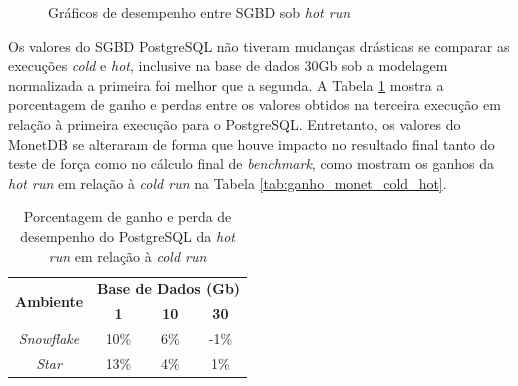 \begin{figure}[htpb]
        \centering
        \caption{Gráficos de desempenho entre SGBD sob \textit{hot run}}
        \label{fig:qph_sgbd_hot}
\end{figure}

Os valores do SGBD PostgreSQL não tiveram mudanças drásticas se comparar as execuções \textit{cold} e \textit{hot}, inclusive na base de dados 30Gb sob a modelagem normalizada a primeira foi melhor que a segunda. A Tabela \ref{tab:ganho_postgresql_cold_hot} mostra a porcentagem de ganho e perdas entre os valores obtidos na terceira execução em relação à primeira execução para o PostgreSQL. Entretanto, os valores do MonetDB se alteraram de forma que houve impacto no resultado final tanto do teste de força como no cálculo final de \textit{benchmark}, como mostram os ganhos da \textit{hot run} em relação à \textit{cold run} na Tabela \ref{tab:ganho_monet_cold_hot}.

\begin{table}[htpb]
        \centering
        \caption{Porcentagem de ganho e perda de desempenho do PostgreSQL da \textit{hot run} em relação à \textit{cold run}}
        \label{tab:ganho_postgresql_cold_hot}
        \begin{tabular}{|c|c|c|c|}
        \hline
        \multirow{2}{*}{\textbf{Ambiente}} & \multicolumn{3}{c|}{\textbf{Base de Dados (Gb)}} \\ \cline{2-4} 
        & \textbf{1}     & \textbf{10}    & \textbf{30}    \\ \hline
        \textit{Snowflake}                 & 10\%           & 6\%            & -1\%           \\ \hline
        \textit{Star}                      & 13\%           & 4\%            & 1\%            \\ \hline
        \end{tabular}
\end{table}

